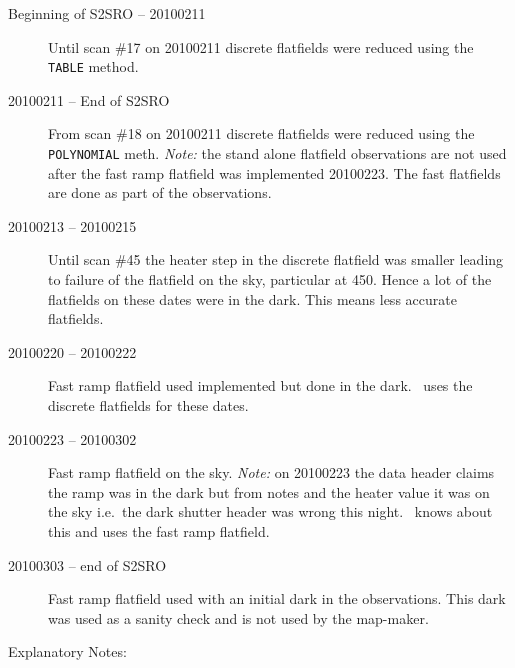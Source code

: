 \documentclass[twoside,11pt]{starlink}
\providecommand{\smurf}{\xref{\textsc{Smurf}}{sun258}{}}
\providecommand{\param}[1]{\texttt{#1}}
\begin{document}
\begin{description}

\item[Beginning of S2SRO -- 20100211] \mbox{}

  Until scan \#17 on 20100211 discrete flatfields were reduced using
  the \param{TABLE} method.

\item[20100211 -- End of S2SRO] \mbox{}

  From scan \#18 on 20100211 discrete flatfields were reduced using
  the \param{POLYNOMIAL} meth. \textit{Note:} the stand alone
  flatfield observations are not used after the fast ramp flatfield
  was implemented 20100223. The fast flatfields are done as part of
  the observations.

\item[20100213 -- 20100215] \mbox{}

  Until scan \#45 the heater step in the discrete flatfield was
  smaller leading to failure of the flatfield on the sky, particular
  at 450. Hence a lot of the flatfields on these dates were in the dark.
  This means less accurate flatfields.

\item[20100220 -- 20100222] \mbox{}

  Fast ramp flatfield used implemented but done in the dark. \smurf\
  uses the discrete flatfields for these dates.

\item[20100223 -- 20100302] \mbox{}

  Fast ramp flatfield on the sky.  \textit{Note:} on 20100223 the data header
  claims the ramp was in the dark but from notes and the heater value
  it was on the sky i.e.\ the dark shutter header was wrong this
  night. \smurf\ knows about this and uses the fast ramp flatfield.

\item[20100303 -- end of S2SRO] \mbox{}

  Fast ramp flatfield used with an initial dark in the
  observations. This dark was used as a sanity check and is not used
  by the map-maker.

\end{description}

Explanatory Notes:
\end{document}
